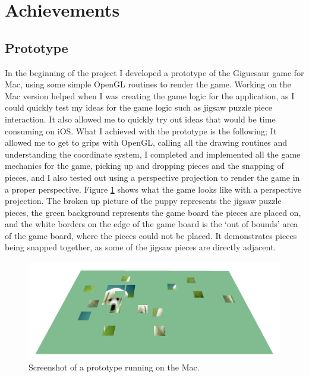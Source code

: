 \documentclass{article}
\begin{document}

\section{Achievements}

\subsection{Prototype}
In the beginning of the project I developed a prototype of the Giguesaur game
for Mac, using some simple \gls{OpenGL} routines to render the game. Working on
the Mac version helped when I was creating the game logic for the application,
as I could quickly test my ideas for the game logic such as jigsaw puzzle piece
interaction. It also allowed me to quickly try out ideas that would be time
consuming on iOS. What I achieved with the prototype is the following; It
allowed me to get to grips with OpenGL, calling all the drawing routines and
understanding the coordinate system, I completed and implemented all the game
mechanics for the game, picking up and dropping pieces and the snapping of
pieces, and I also tested out using a perspective projection to render the game
in a proper perspective. Figure \ref{fig:MacBuild} shows what the game looks
like with a perspective projection. The broken up picture of the puppy
\cite{img:OpenGLPuppy} represents the jigsaw puzzle pieces, the green background
represents the game board the pieces are placed on, and the white borders on the
edge of the game board is the `out of bounds' area of the game board, where the
pieces could not be placed. It demonstrates pieces being snapped together, as
some of the jigsaw pieces are directly adjacent.

\begin{figure}[ht]
\begin{center}
\includegraphics[width=1.2\textwidth,center]{images/MacBuildImage}
\caption{Screenshot of a prototype running on the Mac.}
\label{fig:MacBuild}
\end{center}
\end{figure}
\end{document}
